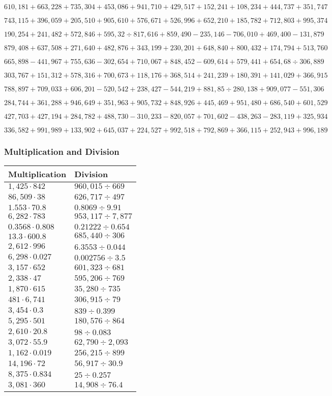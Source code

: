 \(610,181+663,228+735,304+453,086+941,710+429,517+152,241+108,234+444,737+ 351,747\)

\(743,115+396,059+205,510+905,610+576,671+526,996+652,210+185,782+712,803+995,374\)

\(190,254+241,482+572,846+595,32÷817,616+859,490-235,146-706,010+469,400-131,879\)

\(879,408+637,508+271,640+482,876+343,199+230,201+648,840+800,432+174,794+513,760\)

\(665,898-441,967+755,636-302,654+710,067+848,452-609,614+579,441+654,68÷306,889\)

\(303,767+151,312+578,316+700,673+118,176+368,514+241,239+180,391+141,029+366,915\)

\(788,897+709,033+606,201-520,542+238,427-544,219+881,85÷280,138+909,077-551,306\)

\(284,744+361,288+946,649+351,963+905,732+848,926+445,469+951,480+686,540+601,529\)

\(427,703+427,194+284,782+488,730-310,233-820,057+701,602-438,263-283,119+325,934\)

\(336,582+991,989+133,902+645,037+224,527+992,518+792,869+366,115+252,943+996,189\)

\hypertarget{multiplication-and-division-352}{%
\subsubsection{Multiplication and
Division}\label{multiplication-and-division-352}}

\begin{longtable}[]{@{}ll@{}}
\toprule
Multiplication & Division\tabularnewline
\midrule
\endhead
\(1,425\cdot842\) & \(960,015÷669\)\tabularnewline
\(86,509\cdot38\) & \(626,717÷497\)\tabularnewline
\(1.553\cdot70.8\) & \(0.8069÷9.91\)\tabularnewline
\(6,282\cdot783\) & \(953,117÷7,877\)\tabularnewline
\(0.3568\cdot0.808\) & \(0.21222÷0.654\)\tabularnewline
\(13.3\cdot600.8\) & \(685,440÷306\)\tabularnewline
\(2,612\cdot996\) & \(6.3553÷0.044\)\tabularnewline
\(6,298\cdot0.027\) & \(0.002756÷3.5\)\tabularnewline
\(3,157\cdot652\) & \(601,323÷681\)\tabularnewline
\(2,338\cdot47\) & \(595,206÷769\)\tabularnewline
\(1,870\cdot615\) & \(35,280÷735\)\tabularnewline
\(481\cdot6,741\) & \(306,915÷79\)\tabularnewline
\(3,454\cdot0.3\) & \(839÷0.399\)\tabularnewline
\(5,295\cdot501\) & \(180,576÷864\)\tabularnewline
\(2,610\cdot20.8\) & \(98÷0.083\)\tabularnewline
\(3,072\cdot55.9\) & \(62,790÷2,093\)\tabularnewline
\(1,162\cdot0.019\) & \(256,215÷899\)\tabularnewline
\(14,196\cdot72\) & \(56,917÷30.9\)\tabularnewline
\(8,375\cdot0.834\) & \(25÷0.257\)\tabularnewline
\(3,081\cdot360\) & \(14,908÷76.4\)\tabularnewline
\bottomrule
\end{longtable}

